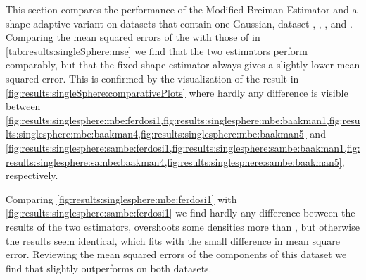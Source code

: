 
\begin{figure*}
	\centering
	
	\caption{Plot of the estimated density as a function of the known density of the datasets with a single Gaussian by (-) \mbe and (-) \sambe.}
	\label{fig:results:singleSphere:comparativePlots}
\end{figure*}

\begin{table}
	\centering
	
	\caption{Performance of the Modified Breiman Estimator with fixed-shaped and shape-adaptive kernels on the datasets with a single Gaussian.} 	
	\label{tab:results:singleSphere:mse}
\end{table}

This section compares the performance of the Modified Breiman Estimator and a shape-adaptive variant on datasets that contain one Gaussian, \ie dataset \ferdosiOne, \baakmanOne, \baakmanFour, and \baakmanFive. Comparing the mean squared errors of the \mbe with those of \sambe in \cref{tab:results:singleSphere:mse} we find that the two estimators perform comparably, but that the fixed-shape estimator always gives a slightly lower mean squared error. This is confirmed by the visualization of the result in \cref{fig:results:singleSphere:comparativePlots} where hardly any difference is visible between \cref{fig:results:singlesphere:mbe:ferdosi1,fig:results:singlesphere:mbe:baakman1,fig:results:singlesphere:mbe:baakman4,fig:results:singlesphere:mbe:baakman5} and \cref{fig:results:singlesphere:sambe:ferdosi1,fig:results:singlesphere:sambe:baakman1,fig:results:singlesphere:sambe:baakman4,fig:results:singlesphere:sambe:baakman5}, respectively.

		Comparing \cref{fig:results:singlesphere:mbe:ferdosi1} with \cref{fig:results:singlesphere:sambe:ferdosi1} we find hardly any difference between the results of the two estimators, \sambe overshoots some densities more than \mbe, but otherwise the results seem identical, which fits with the small difference in mean square error. 
		Reviewing the mean squared errors of the components of this dataset we find that \mbe slightly outperforms \sambe on both datasets.





